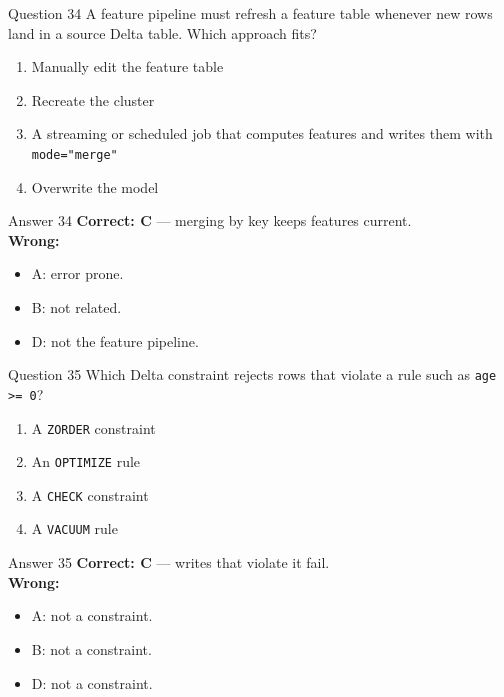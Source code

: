 \documentclass[aspectratio=169,11pt]{beamer}
\begin{document}
\begin{frame}{Question 34}
A feature pipeline must refresh a feature table whenever new rows land in a source Delta table. Which approach fits?
\begin{enumerate}[label=\Alph*.]
\item Manually edit the feature table
\item Recreate the cluster
\item A streaming or scheduled job that computes features and writes them with \texttt{mode="merge"}
\item Overwrite the model
\end{enumerate}
\end{frame}
\begin{frame}{Answer 34}
\textbf{Correct: C} --- merging by key keeps features current.\\
\vspace{0.5em}
\textbf{Wrong:}
\begin{itemize}
\item A: error prone.
\item B: not related.
\item D: not the feature pipeline.
\end{itemize}
\end{frame}

\begin{frame}{Question 35}
Which Delta constraint rejects rows that violate a rule such as \texttt{age >= 0}?
\begin{enumerate}[label=\Alph*.]
\item A \texttt{ZORDER} constraint
\item An \texttt{OPTIMIZE} rule
\item A \texttt{CHECK} constraint
\item A \texttt{VACUUM} rule
\end{enumerate}
\end{frame}
\begin{frame}{Answer 35}
\textbf{Correct: C} --- writes that violate it fail.\\
\vspace{0.5em}
\textbf{Wrong:}
\begin{itemize}
\item A: not a constraint.
\item B: not a constraint.
\item D: not a constraint.
\end{itemize}
\end{frame}
\end{document}

